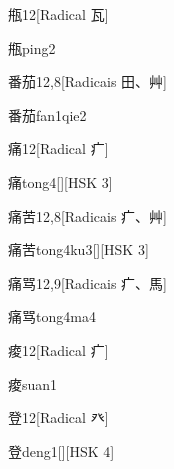 \begin{entry}{甁}{12}[Radical ⽡]
  \begin{phonetics}{甁}{ping2}
  \end{phonetics}
\end{entry}

\begin{entry}{番茄}{12,8}[Radicais ⽥、⾋]
  \begin{phonetics}{番茄}{fan1qie2}
  \end{phonetics}
\end{entry}

\begin{entry}{痛}{12}[Radical ⽧]
  \begin{phonetics}{痛}{tong4}[][HSK 3]
  \end{phonetics}
\end{entry}

\begin{entry}{痛苦}{12,8}[Radicais ⽧、⾋]
  \begin{phonetics}{痛苦}{tong4ku3}[][HSK 3]
  \end{phonetics}
\end{entry}

\begin{entry}{痛骂}{12,9}[Radicais ⽧、⾺]
  \begin{phonetics}{痛骂}{tong4ma4}
  \end{phonetics}
\end{entry}

\begin{entry}{痠}{12}[Radical ⽧]
  \begin{phonetics}{痠}{suan1}
  \end{phonetics}
\end{entry}

\begin{entry}{登}{12}[Radical ⽨]
  \begin{phonetics}{登}{deng1}[][HSK 4]
  \end{phonetics}
\end{entry}

